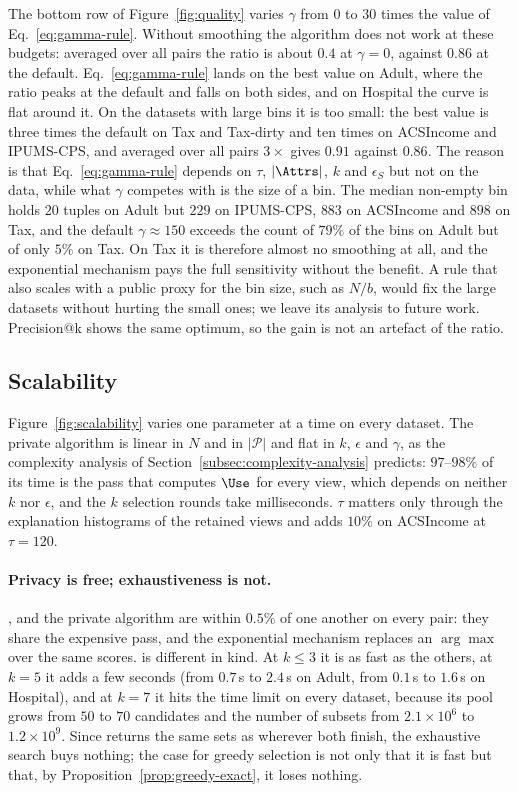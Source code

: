 The bottom row of Figure~\ref{fig:quality} varies $\gamma$ from $0$ to $30$ times the value of Eq.~\eqref{eq:gamma-rule}.
Without smoothing the algorithm does not work at these budgets: averaged over all pairs the ratio is about $0.4$ at $\gamma=0$, against $0.86$ at the default.
Eq.~\eqref{eq:gamma-rule} lands on the best value on Adult, where the ratio peaks at the default and falls on both sides, and on Hospital the curve is flat around it.
On the datasets with large bins it is too small: the best value is three times the default on Tax and Tax-dirty and ten times on ACSIncome and IPUMS-CPS, and averaged over all pairs $3\times$ gives $0.91$ against $0.86$.
The reason is that Eq.~\eqref{eq:gamma-rule} depends on $\tau$, $|\Attrs|$, $k$ and $\epsilon_S$ but not on the data, while what $\gamma$ competes with is the size of a bin.
The median non-empty bin holds $20$ tuples on Adult but $229$ on IPUMS-CPS, $883$ on ACSIncome and $898$ on Tax, and the default $\gamma\approx150$ exceeds the count of $79\%$ of the bins on Adult but of only $5\%$ on Tax.
On Tax it is therefore almost no smoothing at all, and the exponential mechanism pays the full sensitivity without the benefit.
A rule that also scales with a public proxy for the bin size, such as $N/b$, would fix the large datasets without hurting the small ones; we leave its analysis to future work.
Precision@k shows the same optimum, so the gain is not an artefact of the ratio.

\subsection{Scalability}
\label{subsec:scalability}

Figure~\ref{fig:scalability} varies one parameter at a time on every dataset.
The private algorithm is linear in $N$ and in $|\mathcal{P}|$ and flat in $k$, $\epsilon$ and $\gamma$, as the complexity analysis of Section~\ref{subsec:complexity-analysis} predicts: $97$--$98\%$ of its time is the pass that computes $\Use$ for every view, which depends on neither $k$ nor $\epsilon$, and the $k$ selection rounds take milliseconds.
$\tau$ matters only through the explanation histograms of the retained views and adds $10\%$ on ACSIncome at $\tau=120$.

\paragraph{Privacy is free; exhaustiveness is not.}
\Bone{}, \Bthree{} and the private algorithm are within $0.5\%$ of one another on every pair: they share the expensive pass, and the exponential mechanism replaces an $\arg\max$ over the same scores.
\Btwo{} is different in kind.
At $k\le3$ it is as fast as the others, at $k=5$ it adds a few seconds (from $0.7$\,s to $2.4$\,s on Adult, from $0.1$\,s to $1.6$\,s on Hospital), and at $k=7$ it hits the time limit on every dataset, because its pool grows from $50$ to $70$ candidates and the number of subsets from $2.1\times10^{6}$ to $1.2\times10^{9}$.
Since \Bthree{} returns the same sets as \Btwo{} wherever both finish, the exhaustive search buys nothing; the case for greedy selection is not only that it is fast but that, by Proposition~\ref{prop:greedy-exact}, it loses nothing.

